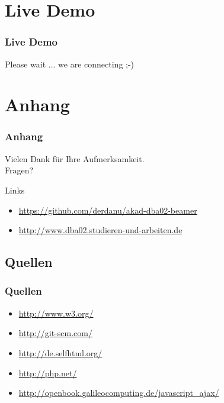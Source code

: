 \documentclass[xcolor=dvipsnames]{beamer}
\begin{document}
\section{Live Demo}
\begin{frame} %
  \frametitle{Live Demo} %
  \begin{center}  
      \Huge	Please wait ... we are connecting ;-)
  \end{center}
\end{frame}


\section{Anhang}
\begin{frame}
  \frametitle{Anhang} %
	\begin{block}{}	
		\begin{center}
			Vielen Dank für Ihre Aufmerksamkeit. \\
			Fragen?
		\end{center}	
	\end{block}
	\begin{block}{Links}	
		\begin{itemize}
			\item \url{https://github.com/derdanu/akad-dba02-beamer}	
			\item \url{http://www.dba02.studieren-und-arbeiten.de}					
		\end{itemize}
	\end{block}
\end{frame}

\subsection{Quellen}
\begin{frame} %
  \frametitle{Quellen} %
 	\begin{itemize}
		\item \url{http://www.w3.org/}
		\item \url{http://git-scm.com/}
		\item \url{http://de.selfhtml.org/}
		\item \url{http://php.net/}
		\item \url{http://openbook.galileocomputing.de/javascript_ajax/}
	\end{itemize}
\end{frame}
\end{document}
